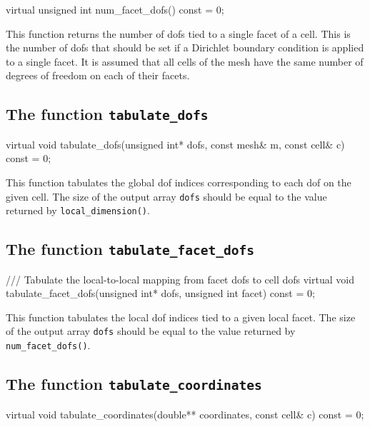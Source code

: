 \begin{code}
virtual unsigned int num_facet_dofs() const = 0;
\end{code}

This function returns the number of dofs tied to a single facet of a
cell. This is the number of dofs that should be set if a Dirichlet
boundary condition is applied to a single facet. It is assumed that
all cells of the mesh have the same number of degrees of freedom on
each of their facets.

\subsection{The function \texttt{tabulate\_dofs}}

\begin{code}
virtual void tabulate_dofs(unsigned int* dofs,
                           const mesh& m,
                           const cell& c) const = 0;
\end{code}

This function tabulates the global dof indices corresponding to each
dof on the given cell. The size of the output array \texttt{dofs}
should be equal to the value returned by \texttt{local\_dimension()}.

\subsection{The function \texttt{tabulate\_facet\_dofs}}

\begin{code}
/// Tabulate the local-to-local mapping from facet dofs to cell dofs
virtual void tabulate_facet_dofs(unsigned int* dofs,
                                 unsigned int facet) const = 0;
\end{code}

This function tabulates the local dof indices tied to a given local
facet. The size of the output array \texttt{dofs} should be equal to
the value returned by \texttt{num\_facet\_dofs()}.

\subsection{The function \texttt{tabulate\_coordinates}}

\begin{code}
virtual void tabulate_coordinates(double** coordinates,
                                  const cell& c) const = 0;
\end{code}

